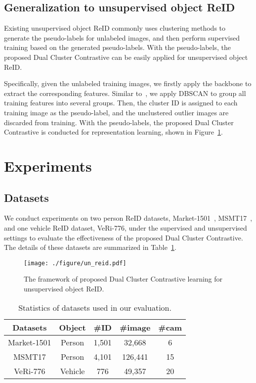\documentclass[10pt,twocolumn,letterpaper]{article}
\begin{document}
\subsection{Generalization to unsupervised object ReID}
Existing unsupervised object ReID commonly uses clustering methods to generate the pseudo-labels for unlabeled images, and then perform supervised training based on the generated pseudo-labels.
With the pseudo-labels, the proposed Dual Cluster Contrastive can be easily applied for unsupervised object ReID.

Specifically, given the unlabeled training images, we firstly apply the backbone to extract the corresponding features.
Similar to~\cite{dai2021cluster}, we apply DBSCAN to group all training features into several groups.
Then, the cluster ID is assigned to each training image as the pseudo-label, and the unclustered outlier images are discarded from training.
With the pseudo-labels, the proposed Dual Cluster Contrastive is conducted for representation learning, shown in Figure~\ref{fig:un_reid}.

\section{Experiments}\label{sec:experiment}
\subsection{Datasets}
We conduct experiments on two person ReID datasets, Market-1501~\cite{zheng2015scalable}, MSMT17~\cite{wei2018person}, and one vehicle ReID dataset, VeRi-776, under the supervised and unsupervised settings to evaluate the effectiveness of the proposed Dual Cluster Contrastive.
The details of these datasets are summarized in Table~\ref{tab:dataset}.

\begin{figure}
  \centering
   \texttt{[image: ./figure/un\_reid.pdf]}
   \caption{\small The framework of proposed Dual Cluster Contrastive learning for unsupervised object ReID.}
   \label{fig:un_reid}
\end{figure}

\begin{table}
\footnotesize
\begin{center}
\begin{tabular}{c|cccc}
\toprule
Datasets         & Object& \#ID & \#image & \#cam\\
\midrule
Market-1501 & Person & 1,501 & 32,668 & 6 \\
MSMT17 & Person & 4,101 & 126,441 & 15 \\
VeRi-776 & Vehicle & 776 & 49,357 & 20 \\ \bottomrule
\end{tabular}
\caption{\small Statistics of datasets used in our evaluation.}
\label{tab:dataset}
\end{center}
\end{table}
\end{document}

